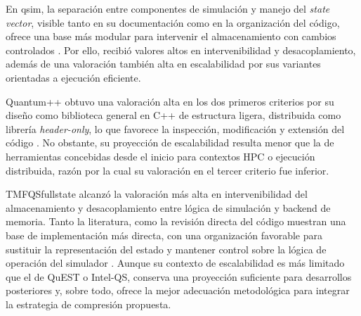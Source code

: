 En qsim, la separación entre componentes de simulación y manejo del \emph{state
vector}, visible tanto en su documentación como en la organización del código, ofrece
una base más modular para intervenir el almacenamiento con cambios controlados
\parencite{qsim_repo, qsim_cirq}. Por ello, recibió valores altos en intervenibilidad y
desacoplamiento, además de una valoración también alta en escalabilidad por sus
variantes orientadas a ejecución eficiente.

Quantum++ obtuvo una valoración alta en los dos primeros criterios por su diseño como
biblioteca general en C++ de estructura ligera, distribuida como librería
\emph{header-only}, lo que favorece la inspección, modificación y extensión del código
\parencite{qpp_paper}. No obstante, su proyección de escalabilidad resulta menor que la de
herramientas concebidas desde el inicio para contextos HPC o ejecución distribuida,
razón por la cual su valoración en el tercer criterio fue inferior.

TMFQSfullstate alcanzó la valoración más alta en intervenibilidad del almacenamiento y
desacoplamiento entre lógica de simulación y backend de memoria. Tanto la literatura,
como la revisión directa del código muestran una base de implementación más
directa, con una organización favorable para sustituir la representación del estado y
mantener control sobre la lógica de operación del simulador
\parencite{diaz2024software, diaz_mdpi_mmss, tmfqs_repo}. Aunque su contexto de
escalabilidad es más limitado que el de QuEST o Intel-QS, conserva una proyección
suficiente para desarrollos posteriores y, sobre todo, ofrece la mejor adecuación
metodológica para integrar la estrategia de compresión propuesta.
